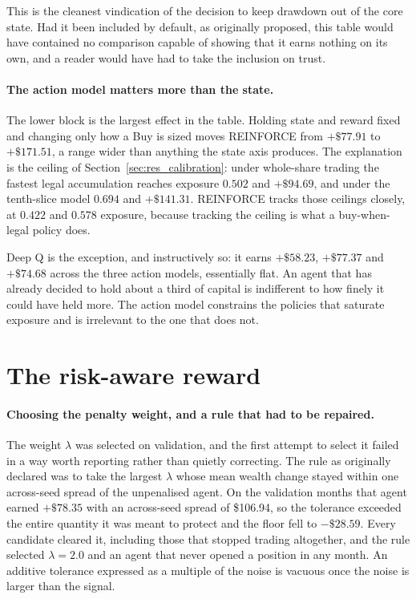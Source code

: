 This is the cleanest vindication of the decision to keep drawdown out of the
core state. Had it been included by default, as originally proposed, this table
would have contained no comparison capable of showing that it earns nothing on
its own, and a reader would have had to take the inclusion on trust.

\paragraph{The action model matters more than the state.} The lower block is the
largest effect in the table. Holding state and reward fixed and changing only how
a Buy is sized moves REINFORCE from $+\$77.91$ to $+\$171.51$, a range wider than
anything the state axis produces. The explanation is the ceiling of
Section~\ref{sec:res_calibration}: under whole-share trading the fastest legal
accumulation reaches exposure $0.502$ and $+\$94.69$, and under the tenth-slice
model $0.694$ and $+\$141.31$. REINFORCE tracks those ceilings closely, at
$0.422$ and $0.578$ exposure, because tracking the ceiling is what a
buy-when-legal policy does.

Deep Q is the exception, and instructively so: it earns $+\$58.23$, $+\$77.37$
and $+\$74.68$ across the three action models, essentially flat. An agent that
has already decided to hold about a third of capital is indifferent to how
finely it could have held more. The action model constrains the policies that
saturate exposure and is irrelevant to the one that does not.

\section{The risk-aware reward}
\label{sec:res_risk}

\paragraph{Choosing the penalty weight, and a rule that had to be repaired.}
The weight $\lambda$ was selected on validation, and the first attempt to select
it failed in a way worth reporting rather than quietly correcting. The rule as
originally declared was to take the largest $\lambda$ whose mean wealth change
stayed within one across-seed spread of the unpenalised agent. On the validation
months that agent earned $+\$78.35$ with an across-seed spread of \$106.94, so
the tolerance exceeded the entire quantity it was meant to protect and the floor
fell to $-\$28.59$. Every candidate cleared it, including those that stopped
trading altogether, and the rule selected $\lambda = 2.0$ and an agent that never
opened a position in any month. An additive tolerance expressed as a multiple of
the noise is vacuous once the noise is larger than the signal.

